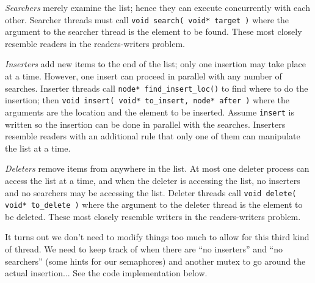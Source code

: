 \textit{Searchers} merely examine the list; hence they can execute concurrently with each other. Searcher threads must call \texttt{void search( void* target )} where the argument to the searcher thread is the element to be found. These most closely resemble readers in the readers-writers problem.

\textit{Inserters} add new items to the end of the list; only one insertion may take place at a time. However, one insert can proceed in parallel with any number of searches. Inserter threads call \texttt{node* find\_insert\_loc()} to find where to do the insertion; then \texttt{void insert( void* to\_insert, node* after )} where the arguments are the location and the element to be inserted. Assume \texttt{insert} is written so the insertion can be done in parallel with the searches. Inserters resemble readers with an additional rule that only one of them can manipulate the list at a time.

\textit{Deleters} remove items from anywhere in the list. At most one deleter process can access the list at a time, and when the deleter is accessing the list, no inserters and no searchers may be accessing the list. Deleter threads call \texttt{void delete( void* to\_delete )} where the argument to the deleter thread is the element to be deleted. These most closely resemble writers in the readers-writers problem.

It turns out we don't need to modify things too much to allow for this third kind of thread. We need to keep track of when there are ``no inserters'' and ``no searchers'' (some hints for our semaphores) and another mutex to go around the actual insertion... See the code implementation below.

\newpage

